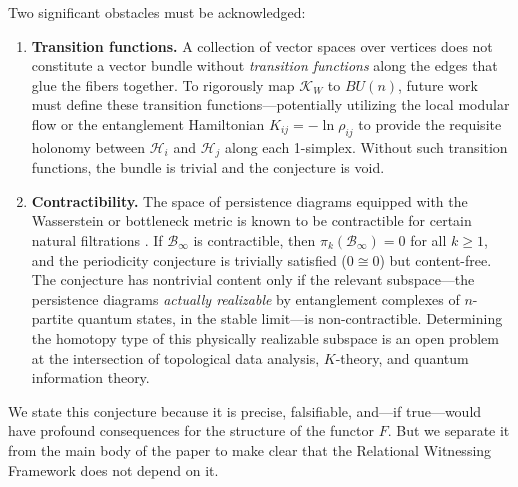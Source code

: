 \documentclass[11pt, a4paper]{article}
\begin{document}
Two significant obstacles must be acknowledged:

\begin{enumerate}
    \item \textbf{Transition functions.} A collection of vector spaces over vertices does not constitute a vector bundle without \emph{transition functions} along the edges that glue the fibers together. To rigorously map $\mathcal{K}_W$ to $BU(n)$, future work must define these transition functions---potentially utilizing the local modular flow or the entanglement Hamiltonian $K_{ij} = -\ln \rho_{ij}$ to provide the requisite holonomy between $\mathcal{H}_i$ and $\mathcal{H}_j$ along each 1-simplex. Without such transition functions, the bundle is trivial and the conjecture is void.

    \item \textbf{Contractibility.} The space of persistence diagrams equipped with the Wasserstein or bottleneck metric is known to be contractible for certain natural filtrations \cite{Mileyko2011}. If $\mathcal{B}_\infty$ is contractible, then $\pi_k(\mathcal{B}_\infty) = 0$ for all $k \geq 1$, and the periodicity conjecture is trivially satisfied ($0 \cong 0$) but content-free. The conjecture has nontrivial content only if the relevant subspace---the persistence diagrams \emph{actually realizable} by entanglement complexes of $n$-partite quantum states, in the stable limit---is non-contractible. Determining the homotopy type of this physically realizable subspace is an open problem at the intersection of topological data analysis, $K$-theory, and quantum information theory.
\end{enumerate}

We state this conjecture because it is precise, falsifiable, and---if true---would have profound consequences for the structure of the functor $F$. But we separate it from the main body of the paper to make clear that the Relational Witnessing Framework does not depend on it.
\end{document}
